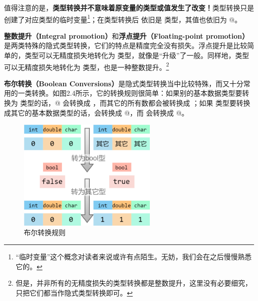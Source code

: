 值得注意的是，\textbf{类型转换并不意味着原变量的类型或值发生了改变！}类型转换只是创建了对应类型的临时变量\footnote{``临时变量''这个概念对读者来说或许有点陌生。无妨，我们会在之后慢慢熟悉它的。}；在类型转换后 \lstinline@d@ 依旧是 \lstinline@double@ 类型，其值也依旧为 @。\par
\textbf{整数提升（Integral promotion）}和\textbf{浮点提升（Floating-point promotion）}是两类特殊的隐式类型转换，它们的特点是精度完全没有损失。浮点提升是比较简单的，\lstinline@float@ 类型可以无精度损失地转化为 \lstinline@double@ 类型，就像是``升级''了一般。同样地，\lstinline@char@ 类型可以无精度损失地转化为 \lstinline@int@ 类型，也是一种整数提升。\footnote{但是，并非所有的无精度损失的类型转换都是整数提升，这里没有必要细究，只把它们都当作隐式类型转换即可。}\par
\label{con:boolean_conversions}
\textbf{布尔转换（Boolean Conversions）}是隐式类型转换当中比较特殊，而又十分常用的一类转换。如图2.4所示，它的转换规则很简单：如果别的基本数据类型要转换为 \lstinline@bool@ 类型的话，@ 会转换成 \lstinline@false@，而其它的所有数都会被转换成 \lstinline@true@；如果 \lstinline@bool@ 类型要转换成其它的基本数据类型的话，\lstinline@false@ 会转换成 @，而 \lstinline@true@ 会转换成 @。\par
\begin{figure}[htbp]
    \centering
    \includegraphics[width=0.6\textwidth]{../images/generalized_parts/02_boolean_conversion.drawio.png}
    \caption{布尔转换规则}
\end{figure}
